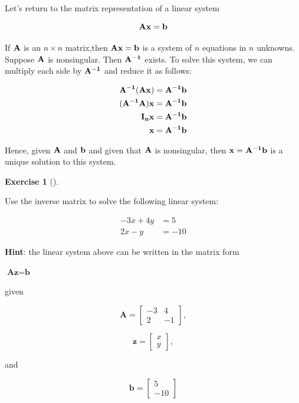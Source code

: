 \documentclass[
  letterpaper,
]{book}
\theoremstyle{definition}
\theoremstyle{definition}
\theoremstyle{plain}
\theoremstyle{definition}
\newtheorem{exercise}{Exercise}[chapter]
\theoremstyle{plain}
\theoremstyle{plain}
\theoremstyle{remark}
\begin{document}
Let's return to the matrix representation of a linear system

\[\bf{Ax} = \bf{b}\]

If \(\bf{A}\) is an \(n\times n\) matrix,then \(\bf{Ax}=\bf{b}\) is a
system of \(n\) equations in \(n\) unknowns. Suppose \(\bf{A}\) is
nonsingular. Then \(\bf{A}^{-1}\) exists. To solve this system, we can
multiply each side by \(\bf{A}^{-1}\) and reduce it as follows:

\[\begin{align*} \bf{A}^{-1} (\bf{A} \bf{x}) & =  \bf{A}^{-1} \bf{b} \\ (\bf{A}^{-1} \bf{A})\bf{x} & =  \bf{A}^{-1} \bf{b}\\ \bf{I}_n \bf{x}     & =  \bf{A}^{-1} \bf{b}\\ \bf{x} & =  \bf{A}^{-1} \bf{b} \end{align*} \]

Hence, given \(\bf{A}\) and \(\bf{b}\) and given that \(\bf{A}\) is
nonsingular, then \(\bf{x} = \bf{A}^{-1} \bf{b}\) is a unique solution
to this system.

\leavevmode{}%
\begin{exercise}[]\label{exr-invlinsys}

Use the inverse matrix to solve the following linear system:

\[ \begin{align*} 
  -3x + 4y &= 5 \\
  2x - y &= -10
  \end{align*} \]

\textbf{Hint}: the linear system above can be written in the matrix form

\(\textbf{A}\textbf{z} = \textbf{b}\)

given

\[\textbf{A} = \begin{bmatrix} -3&4\\2&-1 \end{bmatrix},\]

\[\textbf{z} = \begin{bmatrix} x\\y \end{bmatrix},\]

and

\[\textbf{b} = \begin{bmatrix} 5\\-10 \end{bmatrix}\]

\end{exercise}
\end{document}

